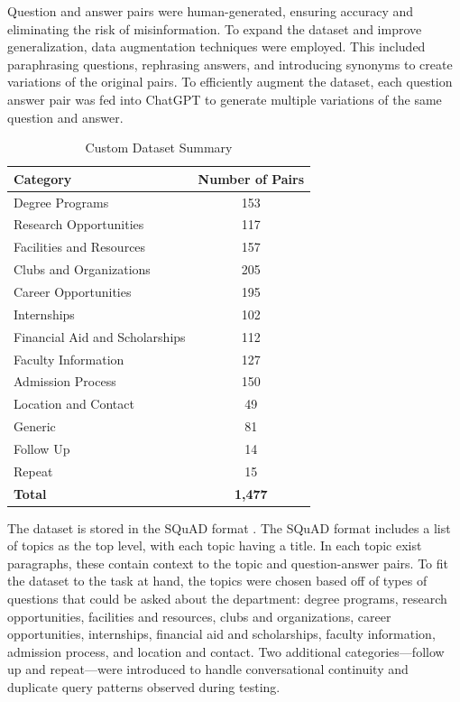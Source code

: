 \documentclass[conference]{IEEEtran}
\begin{document}
Question and answer pairs were human-generated, ensuring accuracy and eliminating the risk of misinformation.
To expand the dataset and improve generalization, data augmentation techniques were employed.
This included paraphrasing questions, rephrasing answers, and introducing synonyms to create variations of the original pairs.
To efficiently augment the dataset, each question answer pair was fed into ChatGPT to generate multiple variations of the same question and answer.

\begin{table}[!h]
    \centering
    \caption{Custom Dataset Summary}
    \begin{tabular}{l|c}
        \toprule
        \textbf{Category} & \textbf{Number of Pairs} \\
        \midrule
        Degree Programs & 153 \\
        Research Opportunities & 117 \\
        Facilities and Resources & 157 \\
        Clubs and Organizations & 205 \\
        Career Opportunities & 195 \\
        Internships & 102 \\
        Financial Aid and Scholarships & 112 \\
        Faculty Information & 127 \\
        Admission Process & 150 \\
        Location and Contact & 49 \\
        Generic & 81 \\
        Follow Up & 14 \\
        Repeat & 15 \\
        \bottomrule
        \textbf{Total} & \textbf{1,477} \\
    \end{tabular}
    \label{tab:dataset}
\end{table}

The dataset is stored in the SQuAD format \cite{b7}. 
The SQuAD format includes a list of topics as the top level, with each topic having a title. 
In each topic exist paragraphs, these contain context to the topic and question-answer pairs.
To fit the dataset to the task at hand, the topics were chosen based off of types of questions that could be asked about the department:
degree programs, research opportunities, facilities and resources, clubs and organizations, career opportunities, internships, financial aid and scholarships, faculty information, admission process, and location and contact.
Two additional categories---follow up and repeat---were introduced to handle conversational continuity and duplicate query patterns observed during testing.
\end{document}
